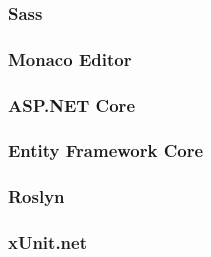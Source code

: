 \subsubsection{Sass}

\subsubsection{Monaco Editor}


\subsubsection{ASP.NET Core}

\subsubsection{Entity Framework Core}


\subsubsection{Roslyn}

\subsubsection{xUnit.net}
